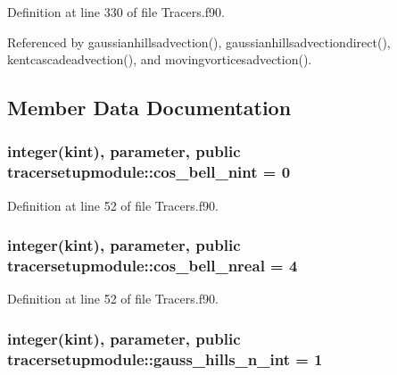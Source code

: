 Definition at line 330 of file Tracers.\+f90.



Referenced by gaussianhillsadvection(), gaussianhillsadvectiondirect(), kentcascadeadvection(), and movingvorticesadvection().



\subsection{Member Data Documentation}
\hypertarget{classtracersetupmodule_a6a3ecc28d9e2aa6689bb12a1af92ab06}{
\subsubsection[{cos\+\_\+bell\+\_\+nint}]{\setlength{\rightskip}{0pt plus 5cm}integer(kint), parameter, public tracersetupmodule\+::cos\+\_\+bell\+\_\+nint = 0}}\label{classtracersetupmodule_a6a3ecc28d9e2aa6689bb12a1af92ab06}


Definition at line 52 of file Tracers.\+f90.

\hypertarget{classtracersetupmodule_ae16b185d402e77f1d88346f78c2b68c3}{
\subsubsection[{cos\+\_\+bell\+\_\+nreal}]{\setlength{\rightskip}{0pt plus 5cm}integer(kint), parameter, public tracersetupmodule\+::cos\+\_\+bell\+\_\+nreal = 4}}\label{classtracersetupmodule_ae16b185d402e77f1d88346f78c2b68c3}


Definition at line 52 of file Tracers.\+f90.

\hypertarget{classtracersetupmodule_af21323b72b36ff76bf144154a20ef027}{
\subsubsection[{gauss\+\_\+hills\+\_\+n\+\_\+int}]{\setlength{\rightskip}{0pt plus 5cm}integer(kint), parameter, public tracersetupmodule\+::gauss\+\_\+hills\+\_\+n\+\_\+int = 1}}\label{classtracersetupmodule_af21323b72b36ff76bf144154a20ef027}


